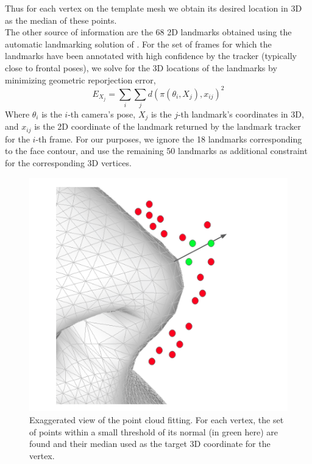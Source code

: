 \documentclass[10pt,twocolumn,letterpaper]{article}
\begin{document}
 Thus for each vertex on the template mesh we obtain its desired location in 3D as the median of these points. \\
 
 The other source of information are the 68 2D landmarks obtained using the automatic landmarking solution of \cite{baltrusaitis2018openface}. For the set of frames for which the landmarks have been annotated with high confidence by the tracker (typically close to frontal poses), we solve for the 3D locations of the landmarks by minimizing geometric reporjection error, 
 \begin{equation}
    E_{X_{j}} = \sum_{i} \sum_{j} d(\pi (\theta_{i},X_{j}),x_{ij})^2
\end{equation}
Where $\theta_i$ is the $i$-th camera's pose, $X_{j}$ is the $j$-th landmark's coordinates in 3D, and $x_{ij}$ is the 2D coordinate of the landmark returned by the landmark tracker for the $i$-th frame. For our purposes, we ignore the 18 landmarks corresponding to the face contour, and use the remaining 50 landmarks as additional constraint for the corresponding 3D vertices. 


 \begin{figure}[t]
\begin{center}
   \includegraphics[width=0.8\linewidth]{images/mesh_fit_pcl.png}
\end{center}
   \caption{Exaggerated view of the point cloud fitting. For each vertex, the set of points within a small threshold of its normal (in green here) are found and their median used as the target 3D coordinate for the vertex. }
\label{fig:mesh_fit_pcl}
\end{figure}
\end{document}
